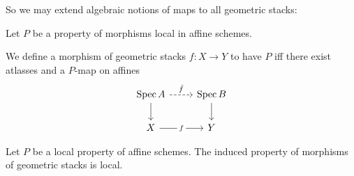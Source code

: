 So we may extend algebraic notions of maps to all geometric stacks:
\begin{definition}
	Let $P$ be a property of morphisms local in affine schemes.
	
	We define a morphism of geometric stacks $f : X \to Y$ to have $P$ iff
	there exist atlasses and a $P$-map on affines 
	\[\begin{tikzcd}
		{\Spec A} & {\Spec B} \\
		X & Y
		\arrow["{\hat f}", dashed, from=1-1, to=1-2]
		\arrow[from=1-1, to=2-1]
		\arrow[from=1-2, to=2-2]
		\arrow["f"{description}, from=2-1, to=2-2]
	\end{tikzcd}\]
\end{definition}
\begin{lemma}
	Let $P$  be a local property of affine schemes. The induced property of morphisms of geometric stacks is local.
\end{lemma}
